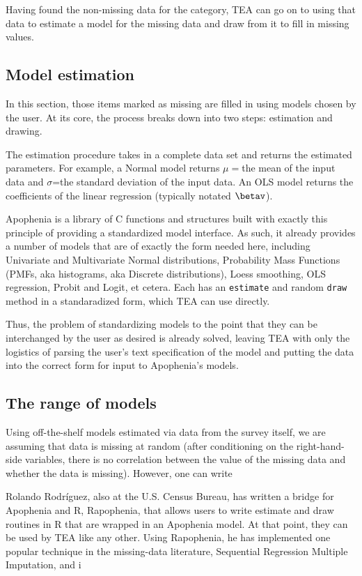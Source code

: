 \documentclass{article}
\begin{document}
Having found the non-missing data for the category, TEA can go on to using that data to
estimate a model for the missing data and draw from it to fill in missing values. 

\subsection{Model estimation}

In this section, those items marked as missing are filled in using models chosen by the
user. At its core, the process breaks down into two steps: estimation and drawing. 

The estimation procedure takes in a complete data set and returns the estimated
parameters. For example, a Normal model returns $\mu=$the mean of the input data and
$\sigma$=the standard deviation of the input data. An OLS model returns the coefficients
of the linear regression (typically notated $\betav$).

Apophenia \citep{klemens:modeling} is a library of C functions and structures built with
exactly this principle of providing a standardized model interface. As such, it already
provides a number of models that are of exactly the form needed here, including
Univariate and Multivariate Normal distributions, Probability Mass Functions (PMFs,
aka histograms, aka Discrete distributions), Loess smoothing, OLS regression, Probit
and Logit, et cetera. Each has an {\tt estimate} and random {\tt draw} method in a
standaradized form, which TEA can use directly.

Thus, the problem of standardizing models to the point that they can be interchanged by
the user as desired is already solved, leaving TEA with only the logistics of parsing the
user's text specification of the model and putting the data into the correct form for
input to Apophenia's models.



\subsection{The range of models} Using off-the-shelf models estimated via data from the
survey itself, we are assuming that data is missing at random (after conditioning on the
right-hand-side variables, there is no correlation between the value of the missing data
and whether the data is missing). However, one can write 

Rolando Rodr\'iguez, also at the U.S. Census Bureau, has written a bridge for Apophenia
and R, Rapophenia, that allows users to write estimate and draw routines in R that are 
wrapped in an Apophenia model. At that point, they can be used by TEA like any other.
Using Rapophenia, he has implemented one popular technique in the missing-data literature,
Sequential Regression Multiple Imputation, and i
\end{document}

